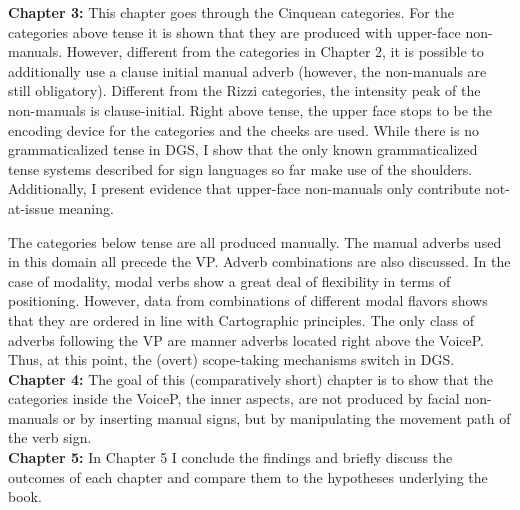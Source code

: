 \documentclass[a4paper,DIV=calc,11pt]{scrartcl}
\begin{document}
\noindent \textbf{Chapter 3:} This chapter goes through the Cinquean categories. For the categories above tense it is shown that they are produced with upper-face non-manuals. However, different from the categories in Chapter 2, it is possible to additionally use a clause initial manual adverb (however, the non-manuals are still obligatory). Different from the Rizzi categories, the intensity peak of the non-manuals is clause-initial. Right above tense, the upper face stops to be the encoding device for the categories and the cheeks are used. While there is no grammaticalized tense in DGS, I show that the only known grammaticalized tense systems described for sign languages so far make use of the shoulders. Additionally, I present evidence that upper-face non-manuals only contribute not-at-issue meaning.

The categories below tense are all produced manually. The manual adverbs used in this domain all precede the VP. Adverb combinations are also discussed. In the case of modality, modal verbs show a great deal of flexibility in terms of positioning. However, data from combinations of different modal flavors shows that they are ordered in line with Cartographic principles. The only class of adverbs following the VP are manner adverbs located right above the VoiceP. Thus, at this point, the (overt) scope-taking mechanisms switch in DGS. \\

\noindent \textbf{Chapter 4:} The goal of this (comparatively short) chapter is to show that the categories inside the VoiceP, the inner aspects, are not produced by facial non-manuals or by inserting manual signs, but by manipulating the movement path of the verb sign.\\

\noindent \textbf{Chapter 5:} In Chapter 5 I conclude the findings and briefly discuss the outcomes of each chapter and compare them to the hypotheses underlying the book.
\end{document}
